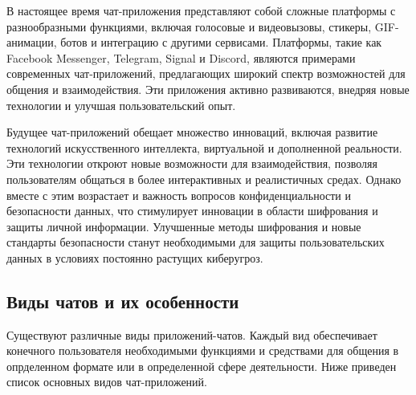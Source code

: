 В настоящее время чат-приложения представляют собой сложные платформы с разнообразными функциями, включая голосовые и видеовызовы, стикеры, GIF-анимации, ботов и интеграцию с другими сервисами. Платформы, такие как Facebook Messenger, Telegram, Signal и Discord, являются примерами современных чат-приложений, предлагающих широкий спектр возможностей для общения и взаимодействия. Эти приложения активно развиваются, внедряя новые технологии и улучшая пользовательский опыт.

Будущее чат-приложений обещает множество инноваций, включая развитие технологий искусственного интеллекта, виртуальной и дополненной реальности. Эти технологии откроют новые возможности для взаимодействия, позволяя пользователям общаться в более интерактивных и реалистичных средах. Однако вместе с этим возрастает и важность вопросов конфиденциальности и безопасности данных, что стимулирует инновации в области шифрования и защиты личной информации. Улучшенные методы шифрования и новые стандарты безопасности станут необходимыми для защиты пользовательских данных в условиях постоянно растущих киберугроз.
\subsection{Виды чатов и их особенности}

Существуют различные виды приложений-чатов. Каждый вид обеспечивает конечного пользователя необходимыми функциями и средствами для общения в опрделенном формате или в определенной сфере деятельности. Ниже приведен список основных видов чат-приложений.

